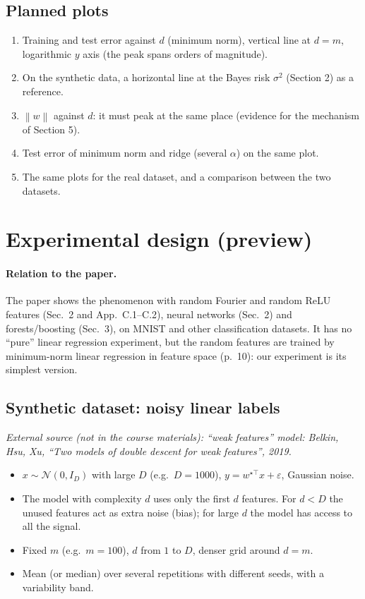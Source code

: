 \documentclass[11pt,a4paper]{article}
\newcommand{\norm}[1]{\left\lVert #1 \right\rVert}
\newcommand{\esterna}[1]{\par\noindent\textit{External source (not in the course materials): #1}\par\smallskip}
\begin{document}
\subsection{Planned plots}
\begin{enumerate}
  \item Training and test error against $d$ (minimum norm), vertical line at $d = m$, logarithmic $y$ axis
        (the peak spans orders of magnitude).
  \item On the synthetic data, a horizontal line at the Bayes risk $\sigma^2$ (Section 2) as a reference.
  \item $\norm{w}$ against $d$: it must peak at the same place (evidence for the mechanism of Section 5).
  \item Test error of minimum norm and ridge (several $\alpha$) on the same plot.
  \item The same plots for the real dataset, and a comparison between the two datasets.
\end{enumerate}

\section{Experimental design (preview)}

\paragraph{Relation to the paper.} The paper shows the phenomenon with random Fourier and random ReLU features (Sec.~2 and App.~C.1--C.2), neural networks (Sec.~2) and forests/boosting (Sec.~3), on MNIST and other classification datasets. It has no ``pure'' linear regression experiment, but the random features are trained by minimum-norm linear regression in feature space (p.~10): our experiment is its simplest version.

\subsection{Synthetic dataset: noisy linear labels}
\esterna{``weak features'' model: Belkin, Hsu, Xu, ``Two models of double descent for weak features'', 2019.}
\begin{itemize}
  \item $x \sim \mathcal{N}(0, I_D)$ with large $D$ (e.g.\ $D = 1000$), $y = w^{\star\top}x + \varepsilon$, Gaussian noise.
  \item The model with complexity $d$ uses only the first $d$ features. For $d < D$ the unused features act as extra
        noise (bias); for large $d$ the model has access to all the signal.
  \item Fixed $m$ (e.g.\ $m = 100$), $d$ from $1$ to $D$, denser grid around $d = m$.
  \item Mean (or median) over several repetitions with different seeds, with a variability band.
\end{itemize}
\end{document}
